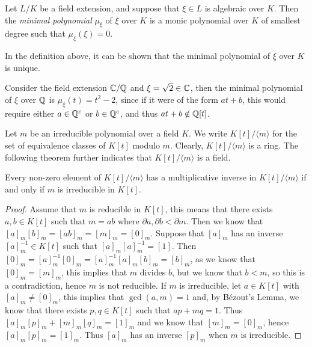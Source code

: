 
\begin{definition}
    Let $L / K$ be a field extension, and suppose that $\xi \in L$ is algebraic over $K$. Then the \textit{minimal polynomial} $\mu_\xi$  of $\xi$ over $K$ is a monic polynomial over $K$ of smallest degree such that $\mu_\xi(\xi)=0$.
\end{definition}
In the definition above, it can be shown that the minimal polynomial of $\xi$ over $K$ is unique. 


\begin{example}
    Consider the field extension $\mathbb C / \mathbb Q$ and $\xi = \sqrt{2} \in \mathbb C$, then the minimal polynomial of $\xi$ over $\mathbb Q$ is $\mu_\xi(t)=t^2-2$, since if it were of the form $at+b$, this would require either $a \in \mathbb Q^c$ or $b \in \mathbb Q^c$, and thus $at+b \notin \mathbb Q[t]$.
\end{example}

Let $m$ be an irreducible polynomial over a field $K$. We write
$
K[t] /\langle m\rangle
$
for the set of equivalence classes of $K[t]$ modulo $m$. Clearly, $K[t] /\langle m\rangle$ is a ring. 
The following theorem further indicates that $K[t] / \langle m \rangle$ is a field. 


\begin{theorem} \label{thm:irreducible-mod-field}
	Every non-zero element of $K[t] /\langle m\rangle$ has a multiplicative inverse in $K[t] /\langle m\rangle$ if and only if $m$ is irreducible in $K[t]$.
\end{theorem}

\begin{proof}
	Assume that \(m\) is reducible in \(K[t]\), this means that there exists \(a,b \in K[t]\) such that \(m = ab\) where \(\partial a,\partial b < \partial m\). Then we know that \([a]_m[b]_m = [ab]_m = [m]_m = [0]_m\). Suppose that \([a]_m\) has an inverse \([a]_m^{-1} \in K[t]\) such that \([a]_m[a]_m^{-1} = [1]\). Then \([0]_m = [a]_m^{-1}[0]_m = [a]_m^{-1}[a]_m[b]_m = [b]_m\), as we know that \([0]_m = [m]_m\), this implies that \(m\) divides \(b\), but we know that \(b < m\), so this is a contradiction, hence \(m\) is not reducible. 
	If \(m\) is irreducible, let \(a \in K[t]\) with \([a]_m \neq [0]_m\), this implies that \(\gcd(a,m)=1\) and, by Bézout's Lemma, we know that there exists \(p,q \in K[t]\) such that \(ap + mq = 1\). Thus \([a]_m[p]_m + [m]_m[q]_m = [1]_m\) and we know that \([m]_m = [0]_m\), hence \([a]_m[p]_m = [1]_m\). Thus \([a]_m\) has an inverse \([p]_m\) when \(m\) is irreducible.
\end{proof}

